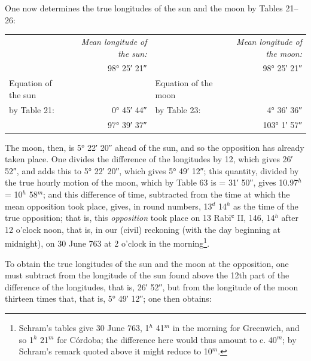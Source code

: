 \documentclass[11pt]{article}
\newcommand{\Pg}[1]{\marginpar{\footnotesize\color{gray}#1}}
\begin{document}
\addtocounter{footnote}{-1}
\par One now determines the true longitudes of the sun and the moon by Tables 21–26:\par
\Pg{85}\begin{center}\small\begin{tabular}{lrlr}
 & \emph{Mean longitude of the sun:} &  & \emph{Mean longitude of the moon:\footnotemark{}} \\
 & 98° 25′ 21″ &  & 98° 25′ 21″ \\
Equation of the sun &  & Equation of the moon &  \\
by Table 21: & 0° 45′ 44″ & by Table 23: & 4° 36′ 36″ \\
 & 97° 39′ 37″ &  & 103° 1′ 57″ \\
\end{tabular}\end{center}
\addtocounter{footnote}{-1}
\par The moon, then, is 5° 22′ 20″ ahead of the sun, and so the opposition has already taken place. One divides the difference of the longitudes by 12, which gives 26′ 52″, and adds this to 5° 22′ 20″, which gives 5° 49′ 12″; this quantity, divided by the true hourly motion of the moon, which by Table 63 is = 31′ 50″, gives 10.97$^{h}$ = 10$^{h}$ 58$^{m}$; and this difference of time, subtracted from the time at which the mean opposition took place, gives, in round numbers, 13$^{d}$ 14$^{h}$ as the time of the true opposition; that is, this \emph{opposition} took place on 13 Rabīʿ II, 146, 14$^{h}$ after 12 o'clock noon, that is, in our (civil) reckoning (with the day beginning at midnight), on 30 June 763 at 2 o'clock in the morning\footnote{Schram's tables give 30 June 763, 1$^{h}$ 41$^{m}$ in the morning for Greenwich, and so 1$^{h}$ 21$^{m}$ for Córdoba; the difference here would thus amount to c. 40$^{m}$; by Schram's remark quoted above it might reduce to 10$^{m}$.}.\par
\par To obtain the true longitudes of the sun and the moon at the opposition, one must subtract from the longitude of the sun found above the 12th part of the difference of the longitudes, that is, 26′ 52″, but from the longitude of the moon thirteen times that, that is, 5° 49′ 12″; one then obtains:\par
\end{document}
